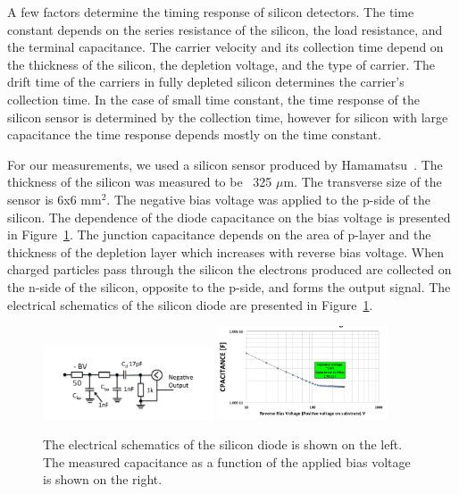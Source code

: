 \documentclass[12pt]{article}
\begin{document}
{A few factors determine the timing response of silicon detectors. The
time constant depends on the series resistance of the silicon, the load
resistance, and the terminal capacitance. The carrier velocity and its collection
time depend on the thickness of the silicon, the depletion voltage, and the type of
carrier. The drift time of the carriers in fully depleted silicon determines the 
carrier's collection time. In the case of small time constant, the time
response of the silicon sensor is determined by the collection time, however
for silicon with large capacitance the time response depends mostly on the
time constant.

For our measurements, we used a silicon sensor produced by
Hamamatsu~\cite{hamamatsu}. The thickness of the silicon was measured to be ~325
$\mu$m. The transverse size of the sensor is 6x6 mm$^2$. The negative bias
voltage was applied to the p-side of the silicon. The dependence of the diode
capacitance on the bias voltage is presented in Figure~\ref{fig:SiliconDiode}.
The junction capacitance depends on the area of p-layer and the thickness of the
depletion layer which increases with reverse bias voltage. When charged
particles pass through the silicon the electrons produced are collected on the
n-side of the silicon, opposite to the p-side, and forms the output signal. The
electrical schematics of the silicon diode are presented in
Figure~\ref{fig:SiliconDiode}.


\begin{figure}[htbp] 
\centering
\includegraphics[width=0.45\textwidth]{plots/SiliconDiodeDiagram.pdf} 
\includegraphics[width=0.45\textwidth]{plots/SiliconDiodeCV.png} 
\caption{The electrical schematics of the silicon diode is shown on the left. The measured
capacitance as a function of the applied bias voltage is shown on the right. } 
\label{fig:SiliconDiode} 
\end{figure} 


}
\end{document}
